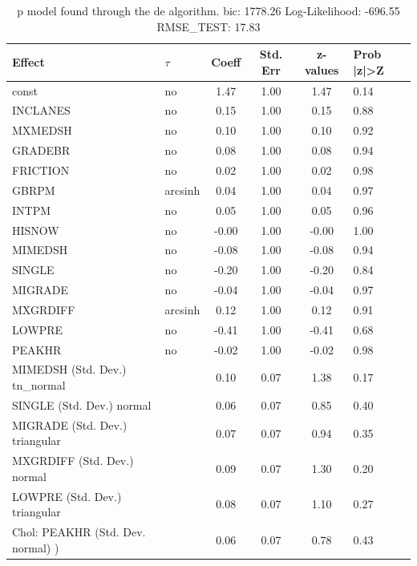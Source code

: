 \begin{table}
	\caption{p model found through the de algorithm. bic: 1778.26 Log-Likelihood: -696.55 RMSE_TEST: 17.83}
	\begin{center}
		\begin{tabular}{|l|l|c|c|c|l|}
			\hline
			Effect & $\tau$ & Coeff & Std. Err & z-values & Prob |z|>Z \\
			\hline
			const & no & 1.47 & 1.00 & 1.47 & 0.14 \\
			\hline
			INCLANES & no & 0.15 & 1.00 & 0.15 & 0.88 \\
			\hline
			MXMEDSH & no & 0.10 & 1.00 & 0.10 & 0.92 \\
			\hline
			GRADEBR & no & 0.08 & 1.00 & 0.08 & 0.94 \\
			\hline
			FRICTION & no & 0.02 & 1.00 & 0.02 & 0.98 \\
			\hline
			GBRPM & arcsinh & 0.04 & 1.00 & 0.04 & 0.97 \\
			\hline
			INTPM & no & 0.05 & 1.00 & 0.05 & 0.96 \\
			\hline
			HISNOW & no & -0.00 & 1.00 & -0.00 & 1.00 \\
			\hline
			MIMEDSH & no & -0.08 & 1.00 & -0.08 & 0.94 \\
			\hline
			SINGLE & no & -0.20 & 1.00 & -0.20 & 0.84 \\
			\hline
			MIGRADE & no & -0.04 & 1.00 & -0.04 & 0.97 \\
			\hline
			MXGRDIFF & arcsinh & 0.12 & 1.00 & 0.12 & 0.91 \\
			\hline
			LOWPRE & no & -0.41 & 1.00 & -0.41 & 0.68 \\
			\hline
			PEAKHR & no & -0.02 & 1.00 & -0.02 & 0.98 \\
			\hline
			MIMEDSH (Std. Dev.) tn_normal &  & 0.10 & 0.07 & 1.38 & 0.17 \\
			\hline
			SINGLE (Std. Dev.) normal &  & 0.06 & 0.07 & 0.85 & 0.40 \\
			\hline
			MIGRADE (Std. Dev.) triangular &  & 0.07 & 0.07 & 0.94 & 0.35 \\
			\hline
			MXGRDIFF (Std. Dev.) normal &  & 0.09 & 0.07 & 1.30 & 0.20 \\
			\hline
			LOWPRE (Std. Dev.) triangular &  & 0.08 & 0.07 & 1.10 & 0.27 \\
			\hline
			 Chol: PEAKHR (Std. Dev. normal) ) &  & 0.06 & 0.07 & 0.78 & 0.43 \\
			\hline
		\end{tabular}
	\end{center}
\end{table}